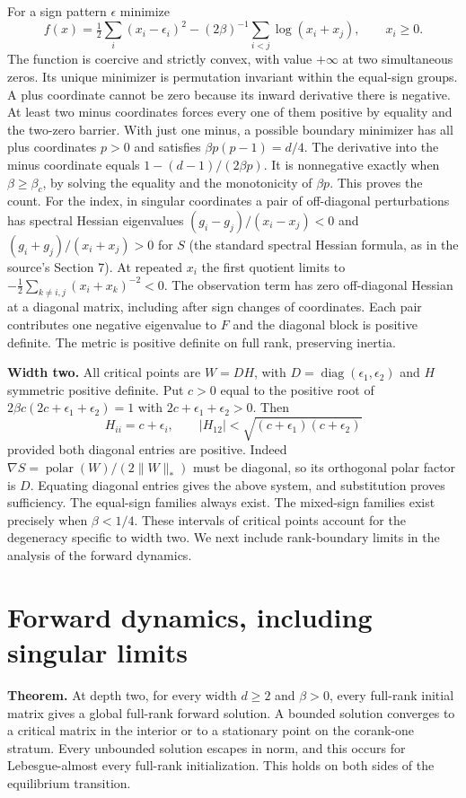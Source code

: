 \documentclass[10pt]{article}
\begin{document}
For a sign pattern $\epsilon$ minimize
\[
 f(x)=\tfrac12\sum_i(x_i-\epsilon_i)^2-(2\beta)^{-1}\sum_{i<j}\log(x_i+x_j),\qquad x_i\ge0 .
\]
The function is coercive and strictly convex, with value $+\infty$ at two simultaneous zeros. Its unique minimizer is permutation invariant within the equal-sign groups. A plus coordinate cannot be zero because its inward derivative there is negative. At least two minus coordinates forces every one of them positive by equality and the two-zero barrier. With just one minus, a possible boundary minimizer has all plus coordinates $p>0$ and satisfies $\beta p(p-1)=d/4$. The derivative into the minus coordinate equals $1-(d-1)/(2\beta p)$. It is nonnegative exactly when $\beta\ge\beta_c$, by solving the equality and the monotonicity of $\beta p$. This proves the count. For the index, in singular coordinates a pair of off-diagonal perturbations has spectral Hessian eigenvalues $(g_i-g_j)/(x_i-x_j)<0$ and $(g_i+g_j)/(x_i+x_j)>0$ for $S$ (the standard spectral Hessian formula, as in the source's Section 7). At repeated $x_i$ the first quotient limits to $-\frac12\sum_{k\ne i,j}(x_i+x_k)^{-2}<0$. The observation term has zero off-diagonal Hessian at a diagonal matrix, including after sign changes of coordinates. Each pair contributes one negative eigenvalue to $F$ and the diagonal block is positive definite. The metric is positive definite on full rank, preserving inertia.

\textbf{Width two.} All critical points are $W=DH$, with $D=\operatorname{diag}(\epsilon_1,\epsilon_2)$ and $H$ symmetric positive definite. Put $c>0$ equal to the positive root of $2\beta c(2c+\epsilon_1+\epsilon_2)=1$ with $2c+\epsilon_1+\epsilon_2>0$. Then
\[
 H_{ii}=c+\epsilon_i,\qquad |H_{12}|<\sqrt{(c+\epsilon_1)(c+\epsilon_2)}
\]
provided both diagonal entries are positive. Indeed $\nabla S=\operatorname{polar}(W)/(2\|W\|_*)$ must be diagonal, so its orthogonal polar factor is $D$. Equating diagonal entries gives the above system, and substitution proves sufficiency. The equal-sign families always exist. The mixed-sign families exist precisely when $\beta<1/4$. These intervals of critical points account for the degeneracy specific to width two. We next include rank-boundary limits in the analysis of the forward dynamics.

\section*{Forward dynamics, including singular limits}
\textbf{Theorem.} At depth two, for every width $d\ge2$ and $\beta>0$, every full-rank initial matrix gives a global full-rank forward solution. A bounded solution converges to a critical matrix in the interior or to a stationary point on the corank-one stratum. Every unbounded solution escapes in norm, and this occurs for Lebesgue-almost every full-rank initialization. This holds on both sides of the equilibrium transition.
\end{document}

